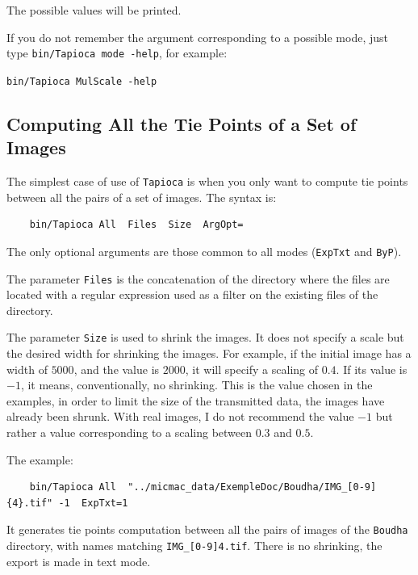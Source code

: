 The possible values will be printed.

If you do not remember the argument
corresponding to a possible mode, just type {\tt bin/Tapioca mode -help},
for example:

\begin{center}
	{\tt bin/Tapioca MulScale -help}
\end{center}




\subsection{Computing All the Tie Points of a Set of Images}

The simplest case of use of {\tt Tapioca} is when you only want to compute tie points
between all the pairs of a set of images. The syntax is:

{\scriptsize
\begin{verbatim}
    bin/Tapioca All  Files  Size  ArgOpt=
\end{verbatim}
}

The only optional arguments are those common to all modes ({\tt ExpTxt}  and {\tt ByP}).

The parameter {\tt Files} is the concatenation of the directory where the files
are located with a regular expression used as a filter on the existing files
of the directory.

The parameter {\tt Size} is used to shrink the images. It does not specify
a scale but the desired width for shrinking the images. For example, if the initial
image has a width of $5000$, and the value is $2000$, it will specify
a scaling of $0.4$. If its value is $-1$, it means, conventionally, no shrinking.
This is the value chosen in the examples, in order  to limit the size of the transmitted
data, the images have already been shrunk. With real images, I do not
recommend the value $-1$ but rather a value corresponding to a scaling
between $0.3$ and $0.5$.


The example:

{\scriptsize
\begin{verbatim}
    bin/Tapioca All  "../micmac_data/ExempleDoc/Boudha/IMG_[0-9]{4}.tif" -1  ExpTxt=1
\end{verbatim}
}

It generates tie points computation between all the pairs of images of the {\tt Boudha} directory,
with names matching {\tt IMG\_[0-9]{4}.tif}. There is no shrinking, the export is
made in text mode.


